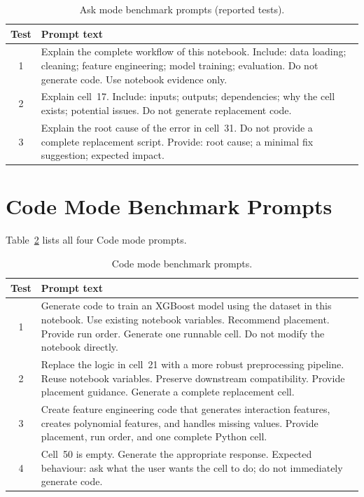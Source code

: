 \begin{table}[!ht]
\centering
\caption{Ask mode benchmark prompts (reported tests).}
\label{tab:app-ask}
\footnotesize
\begin{tabular}{|c|p{10.5cm}|}
\hline
\textbf{Test} & \textbf{Prompt text} \\ \hline
1 & Explain the complete workflow of this notebook. Include: data loading; cleaning; feature engineering; model training; evaluation. Do not generate code. Use notebook evidence only. \\ \hline
2 & Explain cell~17. Include: inputs; outputs; dependencies; why the cell exists; potential issues. Do not generate replacement code. \\ \hline
3 & Explain the root cause of the error in cell~31. Do not provide a complete replacement script. Provide: root cause; a minimal fix suggestion; expected impact. \\ \hline
\end{tabular}
\end{table}

\section{Code Mode Benchmark Prompts}
\label{app:code-prompts}

Table~\ref{tab:app-code} lists all four Code mode prompts.

\begin{table}[!ht]
\centering
\caption{Code mode benchmark prompts.}
\label{tab:app-code}
\footnotesize
\begin{tabular}{|c|p{10.5cm}|}
\hline
\textbf{Test} & \textbf{Prompt text} \\ \hline
1 & Generate code to train an XGBoost model using the dataset in this notebook. Use existing notebook variables. Recommend placement. Provide run order. Generate one runnable cell. Do not modify the notebook directly. \\ \hline
2 & Replace the logic in cell~21 with a more robust preprocessing pipeline. Reuse notebook variables. Preserve downstream compatibility. Provide placement guidance. Generate a complete replacement cell. \\ \hline
3 & Create feature engineering code that generates interaction features, creates polynomial features, and handles missing values. Provide placement, run order, and one complete Python cell. \\ \hline
4 & Cell~50 is empty. Generate the appropriate response. Expected behaviour: ask what the user wants the cell to do; do not immediately generate code. \\ \hline
\end{tabular}
\end{table}

